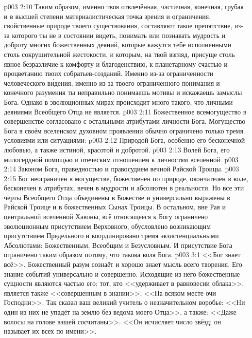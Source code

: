 \vs p003 2:10 Таким образом, именно твоя отвлечённая, частичная, конечная, грубая и в высшей степени материалистическая точка зрения и ограничения, свойственные природе твоего существования, составляют такое препятствие, из-за которого ты не в состоянии видеть, понимать или познавать мудрость и доброту многих божественных деяний, которые кажутся тебе исполненными столь сокрушительной жестокости, и которым, на твой взгляд, присуще столь явное безразличие к комфорту и благоденствию, к планетарному счастью и процветанию твоих собратьев\hyp{}созданий. Именно из-за ограниченности человеческого в\'идения, именно из-за твоего ограниченного понимания и конечного разумения ты неправильно понимаешь мотивы и искажаешь замыслы Бога. Однако в эволюционных мирах происходит много такого, что личными деяниями Всеобщего Отца не является.
\vs p003 2:11 \pc Божественное всемогущество в совершенстве согласовано с остальными атрибутами личности Бога. Могущество Бога в своём вселенском духовном проявлении обычно ограничено только тремя условиями или ситуациями:
\vs p003 2:12 Природой Бога, особенно его бесконечной любовью, а также истиной, красотой и добротой.
\vs p003 2:13 Волей Бога, его милосердной помощью и отеческим отношением к личностям вселенной.
\vs p003 2:14 Законом Бога, праведностью и правосудием вечной Райской Троицы.
\vs p003 2:15 \pc Бог неограничен в могуществе, божественен по природе, окончателен в воле, бесконечен в атрибутах, вечен в мудрости и абсолютен в реальности. Но все эти черты Всеобщего Отца объединены в Божестве и универсально выражены в Райской Троице и в божественных Сынах Троицы. В остальном, вне Рая и центральной вселенной Хавоны, всё относящееся к Богу ограничено эволюционным присутствием Верховного, обусловлено возникающим присутствием Предельного и координировано тремя экзистенциальными Абсолютами: Божественным, Всеобщим и Безусловным. И присутствие Бога ограничено таким образом потому, что такова воля Бога.
\vs p003 3:1 <<Бог знает всё>>. Божественный разум сознаёт и хорошо знает мысль всего творения. Его знание событий универсально и совершенно. Исходящие из него божественные сущности являются частью его; тот, кто <<удерживает в равновесии облака>>, является также <<совершенным в знании>>. <<На всяком месте очи Господни>>. Так сказал ваш великий учитель о незначительном воробье: <<Ни один из них не упадёт на землю без ведома моего Отца>>, а также: <<Даже волосы на голове вашей сосчитаны>>. <<Он исчисляет число звёзд; он называет их всех по имени>>.
